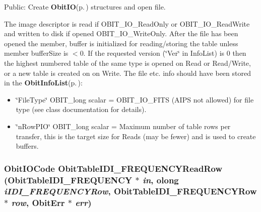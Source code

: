 Public: Create {\bf Obit\-IO}{\rm (p.\,\pageref{structObitIO})} structures and open file. 

The image descriptor is read if OBIT\_\-IO\_\-Read\-Only or OBIT\_\-IO\_\-Read\-Write and written to disk if opened OBIT\_\-IO\_\-Write\-Only. After the file has been opened the member, buffer is initialized for reading/storing the table unless member buffer\-Size is $<$0. If the requested version (\char`\"{}Ver\char`\"{} in Info\-List) is 0 then the highest numbered table of the same type is opened on Read or Read/Write, or a new table is created on on Write. The file etc. info should have been stored in the {\bf Obit\-Info\-List}{\rm (p.\,\pageref{structObitInfoList})}: \begin{itemize}
\item \char`\"{}File\-Type\char`\"{} OBIT\_\-long scalar = OBIT\_\-IO\_\-FITS (AIPS not allowed) for file type (see class documentation for details). \item \char`\"{}n\-Row\-PIO\char`\"{} OBIT\_\-long scalar = Maximum number of table rows per transfer, this is the target size for Reads (may be fewer) and is used to create buffers. 
\end{itemize}
\subsubsection{\setlength{\rightskip}{0pt plus 5cm}Obit\-IOCode Obit\-Table\-IDI\_\-FREQUENCYRead\-Row ({\bf Obit\-Table\-IDI\_\-FREQUENCY} $\ast$ {\em in}, {\bf olong} {\em i\-IDI\_\-FREQUENCYRow}, {\bf Obit\-Table\-IDI\_\-FREQUENCYRow} $\ast$ {\em row}, {\bf Obit\-Err} $\ast$ {\em err})}\label{ObitTableIDI__FREQUENCY_8h_a18}


